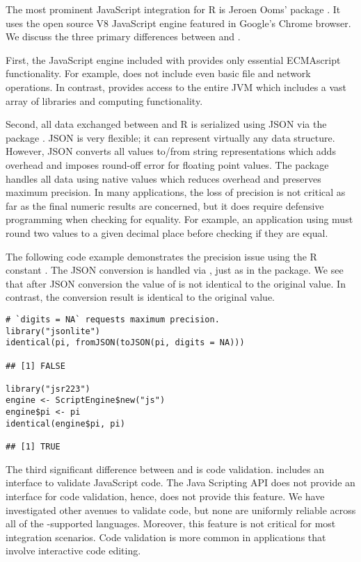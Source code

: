 The most prominent JavaScript integration for R is Jeroen Ooms'  package \citeyearpar{v8pkg}. It uses the open source V8 JavaScript engine \citep{v8javascript} featured in Google's Chrome browser. We discuss the three primary differences between  and .

First, the JavaScript engine included with  provides only essential ECMAscript functionality. For example,  does not include even basic file and network operations. In contrast,  provides access to the entire JVM which includes a vast array of libraries and computing functionality.

Second, all data exchanged between  and R is serialized using JSON via the  package \citep{jsonlite}. JSON is very flexible; it can represent virtually any data structure. However, JSON converts all values to/from string representations which adds overhead and imposes round-off error for floating point values. The  package handles all data using native values which reduces overhead and preserves maximum precision. In many applications, the loss of precision is not critical as far as the final numeric results are concerned, but it does require defensive programming when checking for equality. For example, an application using  must round two values to a given decimal place before checking if they are equal. 

The following code example demonstrates the precision issue using the R constant . The JSON conversion is handled via , just as in the  package. We see that after JSON conversion the value of  is not identical to the original value. In contrast, the  conversion result is identical to the original value.

\begin{verbatim}
# `digits = NA` requests maximum precision.
library("jsonlite")
identical(pi, fromJSON(toJSON(pi, digits = NA)))

## [1] FALSE

library("jsr223")
engine <- ScriptEngine$new("js")
engine$pi <- pi
identical(engine$pi, pi)

## [1] TRUE
\end{verbatim}

The third significant difference between  and  is code validation.  includes an interface to validate JavaScript code. The Java Scripting API does not provide an interface for code validation, hence,  does not provide this feature. We have investigated other avenues to validate code, but none are uniformly reliable across all of the -supported languages. Moreover, this feature is not critical for most integration scenarios. Code validation is more common in applications that involve interactive code editing.

